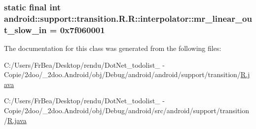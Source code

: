 \hypertarget{classandroid_1_1support_1_1transition_1_1_r_1_1interpolator_ed417eaedb02a0f0ab02d9a26f66e121}{
\subsubsection[{mr\_\-linear\_\-out\_\-slow\_\-in}]{\setlength{\rightskip}{0pt plus 5cm}static final int android::support::transition.R.R::interpolator::mr\_\-linear\_\-out\_\-slow\_\-in = 0x7f060001}}
\label{classandroid_1_1support_1_1transition_1_1_r_1_1interpolator_ed417eaedb02a0f0ab02d9a26f66e121}




The documentation for this class was generated from the following files:\begin{CompactItemize}
\item 
C:/Users/FrBea/Desktop/rendu/DotNet\_\-todolist\_ - Copie/2doo/\_\-2doo.Android/obj/Debug/android/android/support/transition/\hyperlink{android_2support_2transition_2_r_8java}{R.java}\item 
C:/Users/FrBea/Desktop/rendu/DotNet\_\-todolist\_ - Copie/2doo/\_\-2doo.Android/obj/Debug/android/src/android/support/transition/\hyperlink{src_2android_2support_2transition_2_r_8java}{R.java}\end{CompactItemize}
